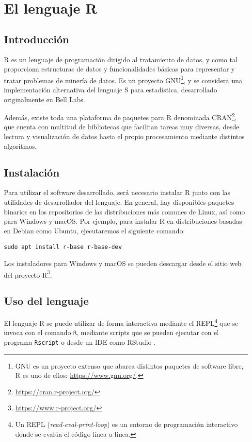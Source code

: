 \section{El lenguaje R}\label{introducciuxf3n-a-r}

\subsection{Introducción}

R \autocite{rlang} es un lenguaje de programación dirigido al tratamiento de datos, y
como tal proporciona estructuras de datos y funcionalidades básicas para
representar y tratar problemas de minería de datos. Es un proyecto GNU\footnote{GNU es un proyecto extenso que abarca distintos paquetes de software libre, R es uno de ellos: \url{https://www.gnu.org/}.}, y se considera una implementación alternativa del lenguaje S para estadística, desarrollado originalmente en Bell Labs.

Además, existe toda
una plataforma de paquetes para R denominada CRAN\footnote{\url{https://cran.r-project.org/}}, que cuenta con
multitud de bibliotecas que facilitan tareas muy diversas, desde lectura y
visualización de datos hasta el propio procesamiento mediante distintos
algoritmos.

\subsection{Instalación}

Para utilizar el software desarrollado, será necesario instalar R junto con las utilidades de desarrollador del lenguaje. En general, hay disponibles paquetes binarios en los repositorios de las distribuciones más comunes de Linux, así como para Windows y macOS. Por ejemplo, para instalar R en distribuciones basadas en Debian como Ubuntu, ejecutaremos el siguiente comando:

\begin{verbatim}
sudo apt install r-base r-base-dev
\end{verbatim}

Los instaladores para Windows y macOS se pueden descargar desde el sitio web del proyecto R\footnote{\url{https://www.r-project.org/}}.

\subsection{Uso del lenguaje}

El lenguaje R se puede utilizar de forma interactiva mediante el REPL\footnote{Un REPL (\emph{read-eval-print-loop}) es un entorno de programación interactivo donde se evalúa el código línea a línea.} que se invoca con el comando \texttt{R}, mediante scripts que se pueden ejecutar con el programa \texttt{Rscript} o desde un IDE como RStudio \autocite{rstudio}.

